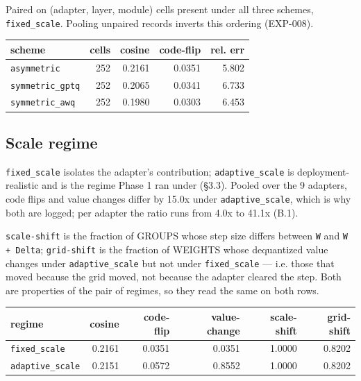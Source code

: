 Paired on (adapter, layer, module) cells present under all three schemes, \texttt{fixed\_\allowbreak{}scale}. Pooling unpaired records inverts this ordering (EXP-008).

\begin{center}\footnotesize
\begin{tabular}{lrrrr}
\toprule
scheme & cells & cosine & code-flip & rel. err \\
\midrule
\texttt{asymmetric} & 252 & 0.2161 & 0.0351 & 5.802 \\
\texttt{symmetric\_\allowbreak{}gptq} & 252 & 0.2065 & 0.0341 & 6.733 \\
\texttt{symmetric\_\allowbreak{}awq} & 252 & 0.1980 & 0.0303 & 6.453 \\
\bottomrule
\end{tabular}
\end{center}

\subsection{Scale regime}

\texttt{fixed\_\allowbreak{}scale} isolates the adapter's contribution; \texttt{adaptive\_\allowbreak{}scale} is deployment-realistic and is the regime Phase 1 ran under (\S{}3.3). Pooled over the 9 adapters, code flips and value changes differ by 15.0x under \texttt{adaptive\_\allowbreak{}scale}, which is why both are logged; per adapter the ratio runs from 4.0x to 41.1x (B.1).

\texttt{scale-\allowbreak{}shift} is the fraction of GROUPS whose step size differs between \texttt{W} and \texttt{W + Delta}; \texttt{grid-\allowbreak{}shift} is the fraction of WEIGHTS whose dequantized value changes under \texttt{adaptive\_\allowbreak{}scale} but not under \texttt{fixed\_\allowbreak{}scale} --- i.e. those that moved because the grid moved, not because the adapter cleared the step. Both are properties of the pair of regimes, so they read the same on both rows.

\begin{table}[t]
\centering\footnotesize
\begin{tabularx}{\textwidth}{>{\hsize=1.000\hsize\raggedright\arraybackslash}Xrrrrr}
\toprule
regime & cosine & code-flip & value-change & scale-shift & grid-shift \\
\midrule
\texttt{fixed\_\allowbreak{}scale} & 0.2161 & 0.0351 & 0.0351 & 1.0000 & 0.8202 \\
\texttt{adaptive\_\allowbreak{}scale} & 0.2151 & 0.0572 & 0.8552 & 1.0000 & 0.8202 \\
\bottomrule
\end{tabularx}
\end{table}

